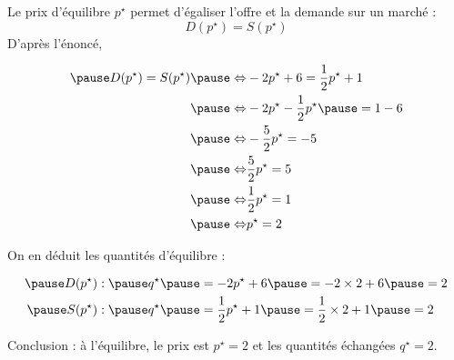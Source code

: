 \documentclass[9pt,professionalfonts,handout,hyperref]{beamer}
\begin{document}
%
%

\begin{frame}

\pause Le prix d'équilibre $p^{\star}$ permet d'égaliser l'offre et la demande sur un marché : $$D(p^{\star}) = S(p^{\star})$$
\pause D'après l'énoncé,

\[\begin{aligned}
\pause D(p^{\star}) = S(p^{\star})
\pause \Leftrightarrow& -2 p^{\star}  + 6 = \frac{1}{2} p^{\star}  + 1\\
\pause \Leftrightarrow& -2 p^{\star} -\frac{1}{2} p^{\star} \pause  = 1 - 6\\
\pause \Leftrightarrow& -\frac{5}{2} p^{\star}  = -5\\
\pause \Leftrightarrow& \frac{5}{2} p^{\star}  = 5\\
\pause \Leftrightarrow& \frac{1}{2} p^{\star}  = 1\\
\pause \Leftrightarrow& p^{\star}  = 2\\
\end{aligned}\]

\pause On en déduit les quantités d'équilibre :

\[\begin{aligned}
\pause D(p^\star): \pause q^\star \pause &= -2 p^\star  + 6 \pause = -2\times 2 +6 \pause = 2\\
\pause S(p^\star): \pause q^\star \pause &= \frac{1}{2} p^\star  + 1 \pause = \frac{1}{2}\times 2  + 1 \pause = 2
\end{aligned}\]

\pause Conclusion : à l'équilibre, le prix est $p^\star = 2$ et les quantités échangées $q^\star = 2$.

\end{frame}



%
%
\end{document}
